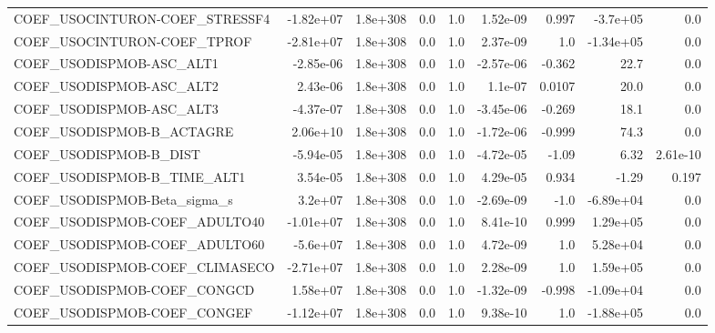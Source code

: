\begin{tabular}{lrrrrrrrr}
COEF\_USOCINTURON-COEF\_STRESSF4    &   -1.82e+07 &     1.8e+308 &     0.0 &      1.0 &   1.52e-09 &       0.997 &     -3.7e+05 &           0.0 \\
COEF\_USOCINTURON-COEF\_TPROF       &   -2.81e+07 &     1.8e+308 &     0.0 &      1.0 &   2.37e-09 &         1.0 &    -1.34e+05 &           0.0 \\
COEF\_USODISPMOB-ASC\_ALT1          &   -2.85e-06 &     1.8e+308 &     0.0 &      1.0 &  -2.57e-06 &      -0.362 &         22.7 &           0.0 \\
COEF\_USODISPMOB-ASC\_ALT2          &    2.43e-06 &     1.8e+308 &     0.0 &      1.0 &    1.1e-07 &      0.0107 &         20.0 &           0.0 \\
COEF\_USODISPMOB-ASC\_ALT3          &   -4.37e-07 &     1.8e+308 &     0.0 &      1.0 &  -3.45e-06 &      -0.269 &         18.1 &           0.0 \\
COEF\_USODISPMOB-B\_ACTAGRE         &    2.06e+10 &     1.8e+308 &     0.0 &      1.0 &  -1.72e-06 &      -0.999 &         74.3 &           0.0 \\
COEF\_USODISPMOB-B\_DIST            &   -5.94e-05 &     1.8e+308 &     0.0 &      1.0 &  -4.72e-05 &       -1.09 &         6.32 &      2.61e-10 \\
COEF\_USODISPMOB-B\_TIME\_ALT1       &    3.54e-05 &     1.8e+308 &     0.0 &      1.0 &   4.29e-05 &       0.934 &        -1.29 &         0.197 \\
COEF\_USODISPMOB-Beta\_sigma\_s      &     3.2e+07 &     1.8e+308 &     0.0 &      1.0 &  -2.69e-09 &        -1.0 &    -6.89e+04 &           0.0 \\
COEF\_USODISPMOB-COEF\_ADULTO40     &   -1.01e+07 &     1.8e+308 &     0.0 &      1.0 &   8.41e-10 &       0.999 &     1.29e+05 &           0.0 \\
COEF\_USODISPMOB-COEF\_ADULTO60     &    -5.6e+07 &     1.8e+308 &     0.0 &      1.0 &   4.72e-09 &         1.0 &     5.28e+04 &           0.0 \\
COEF\_USODISPMOB-COEF\_CLIMASECO    &   -2.71e+07 &     1.8e+308 &     0.0 &      1.0 &   2.28e-09 &         1.0 &     1.59e+05 &           0.0 \\
COEF\_USODISPMOB-COEF\_CONGCD       &    1.58e+07 &     1.8e+308 &     0.0 &      1.0 &  -1.32e-09 &      -0.998 &    -1.09e+04 &           0.0 \\
COEF\_USODISPMOB-COEF\_CONGEF       &   -1.12e+07 &     1.8e+308 &     0.0 &      1.0 &   9.38e-10 &         1.0 &    -1.88e+05 &           0.0 \\

\end{tabular}
